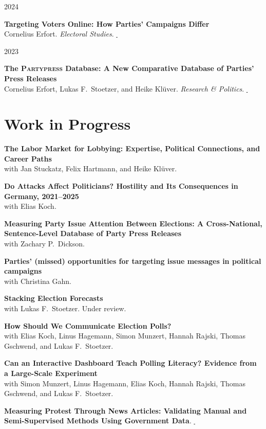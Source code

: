 \documentclass[11pt,a4paper]{article}
\newlength{\cvleftw}\setlength{\cvleftw}{0.20\textwidth}
\newlength{\cvrightw}\setlength{\cvrightw}{0.76\textwidth}
\newlength{\cvgap}\setlength{\cvgap}{0.02\textwidth}
\newenvironment{cventries}{\par\setlength{\parskip}{0pt}}{\par}
\newcommand{\cvitem}[2]{%
  \par\nopagebreak[2]%
  \noindent
  \begin{minipage}[t]{\cvleftw}\raggedright\color{cvmuted}\small\vspace{0pt}\strut #1\end{minipage}%
  \hspace{\cvgap}%
  \begin{minipage}[t]{\cvrightw}\raggedright\vspace{0pt}\strut #2\end{minipage}%
  \par\vspace{10pt plus 3pt minus 2pt}%
}
\newcommand{\cvtitle}[1]{\textbf{#1}}
\newcommand{\cvjournal}[1]{\textit{#1}}
\newcommand{\me}{Cornelius Erfort}
\begin{document}
\begin{cventries}
\cvitem{2024}{%
  \cvtitle{Targeting Voters Online: How Parties' Campaigns Differ} \\
  \me. \cvjournal{Electoral Studies}.
  \href{https://doi.org/10.1016/j.electstud.2024.102872}{\,\faExternalLink*}}
\cvitem{2023}{%
  \cvtitle{The {\scshape Partypress} Database: A New Comparative Database of Parties' Press Releases} \\
  \me, Lukas F.\ Stoetzer, and Heike Kl\"uver. \cvjournal{Research \& Politics}.
  \href{https://doi.org/10.1177/20531680231183512}{\,\faExternalLink*}}
\end{cventries}

\section*{Work in Progress}
\begin{cventries}
\cvitem{}{%
  \cvtitle{The Labor Market for Lobbying: Expertise, Political Connections, and Career Paths} \\
  with Jan Stuckatz, Felix Hartmann, and Heike Kl\"uver.}
\cvitem{}{%
  \cvtitle{Do Attacks Affect Politicians? Hostility and Its Consequences in Germany, 2021--2025} \\
  with Elias Koch.}
\cvitem{}{%
  \cvtitle{Measuring Party Issue Attention Between Elections: A Cross-National, Sentence-Level Database of Party Press Releases} \\
  with Zachary P.\ Dickson.}
\cvitem{}{%
  \cvtitle{Parties' (missed) opportunities for targeting issue messages in political campaigns} \\
  with Christina Gahn.}
\cvitem{}{%
  \cvtitle{Stacking Election Forecasts} \\
  with Lukas F.\ Stoetzer. Under review.}
\cvitem{}{%
  \cvtitle{How Should We Communicate Election Polls?} \\
  with Elias Koch, Linus Hagemann, Simon Munzert, Hannah Rajski, Thomas Gschwend, and Lukas F.\ Stoetzer.}
\cvitem{}{%
  \cvtitle{Can an Interactive Dashboard Teach Polling Literacy? Evidence from a Large-Scale Experiment} \\
  with Simon Munzert, Linus Hagemann, Elias Koch, Hannah Rajski, Thomas Gschwend, and Lukas F.\ Stoetzer.}
\cvitem{}{%
  \cvtitle{Measuring Protest Through News Articles: Validating Manual and Semi-Supervised Methods Using Government Data}.
  \href{https://osf.io/g9t8y/}{\,\faExternalLink*}}
\end{cventries}
\end{document}
